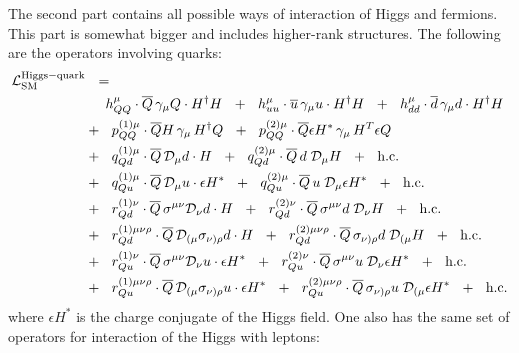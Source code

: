 \documentclass[12pt]{revtex4}
\newcommand{\ov}{\overline}
\newcommand{\md}{\mathcal{D}}
\begin{document}
	The second part contains all possible ways of interaction of
	Higgs and fermions. 
	This part is somewhat bigger and includes higher-rank structures.
	The following are the operators involving quarks:
\begin{align}
\notag
	\mathcal{L}_{\rm SM}^{\rm Higgs-quark} & ~~=~~
	\\
\notag
	&
	\phantom{+~~}
	h_{QQ}^\mu \cdot
	\ov{Q}\, \gamma_\mu Q \cdot H^\dag H ~~+~~
	h_{uu}^\mu \cdot
	\ov{u}\, \gamma_\mu u \cdot H^\dag H ~~+~~
	h_{dd}^\mu \cdot
	\ov{d}\, \gamma_\mu d \cdot H^\dag H 
	\\
\notag
	&
	+~~
	p^{(1)\mu}_{QQ} \cdot
	\ov{Q}H \, \gamma_\mu\, H^\dag Q ~~+~~
	p^{(2)\mu}_{QQ} \cdot
	\ov{Q}\epsilon H^* \, \gamma_\mu \, H^T \epsilon Q 
	\\
\notag
	&
	+~~
	q^{(1)\mu}_{Qd} \cdot
	\ov{Q}\, \md_\mu d\cdot H ~~+~~
	q^{(2)\mu}_{Qd} \cdot
	\ov{Q}\, d \; \md_\mu H ~~+~~
	\text{h.c.}
	\\
\notag
	&
	+~~
	q^{(1)\mu}_{Qu} \cdot
	\ov{Q}\, \md_\mu u \cdot \epsilon H^* ~~+~~
	q^{(2)\mu}_{Qu} \cdot
	\ov{Q}\, u \; \md_\mu \epsilon H^* ~~+~~
	\text{h.c.}
	\\
\notag
	&
	+~~
	r^{(1)\nu}_{Qd} \cdot
	\ov{Q}\, \sigma^{\mu\nu} \md_\nu d \cdot H ~~+~~
	r^{(2)\nu}_{Qd} \cdot
	\ov{Q}\, \sigma^{\mu\nu} d\; \md_\nu H ~~+~~
	\text{h.c.}
	\\
\notag
	&
	+~~
	r^{(1)\mu\nu\rho}_{Qd} \cdot
	\ov{Q}\, \md_{(\mu} \sigma_{\nu)\rho} d \cdot H ~~+~~
	r^{(2)\mu\nu\rho}_{Qd} \cdot
	\ov{Q}\, \sigma_{\nu)\rho} d \; \md_{(\mu} H ~~+~~
	\text{h.c.}
	\\
\notag
	&
	+~~
	r^{(1)\nu}_{Qu} \cdot
	\ov{Q}\, \sigma^{\mu\nu} \md_\nu u \cdot \epsilon H^* ~~+~~
	r^{(2)\nu}_{Qu} \cdot
	\ov{Q}\, \sigma^{\mu\nu} u\; \md_\nu \epsilon H^* ~~+~~
	\text{h.c.}
	\\
\notag
	&
	+~~
	r^{(1)\mu\nu\rho}_{Qu} \cdot
	\ov{Q}\, \md_{(\mu} \sigma_{\nu)\rho} u \cdot \epsilon H^* ~~+~~
	r^{(2)\mu\nu\rho}_{Qu} \cdot
	\ov{Q}\, \sigma_{\nu)\rho} u \; \md_{(\mu} \epsilon H^* ~~+~~
	\text{h.c.}
\end{align}
	where $ \epsilon H^* $ is the charge conjugate of the Higgs field.	
	One also has the same set of operators for interaction of the Higgs 
	with leptons:
\end{document}
